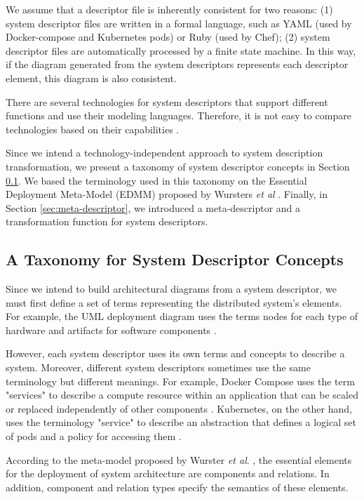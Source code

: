 \documentclass[sigconf]{acmart}
\begin{document}
We assume that a descriptor file is inherently consistent for two reasons: (1) system descriptor files are written in a formal language, such as YAML (used by Docker-compose and Kubernetes pods) or Ruby (used by Chef); (2) system descriptor files are automatically processed by a finite state machine. 
In this way, if the diagram generated from the system descriptors represents each descriptor element, this diagram is also consistent.

There are several technologies for system descriptors that support different functions and use their modeling languages. Therefore, it is not easy to compare technologies based on their capabilities \cite{wurster2019}.

Since we intend a technology-independent approach to system description transformation, we present a taxonomy of system descriptor concepts in Section \ref{sec:taxonomy}. We based the terminology used in this taxonomy on the Essential Deployment Meta-Model (EDMM) proposed by Wursters \textit{et al} \cite{wurster2019}. Finally, in Section \ref{sec:meta-descriptor}, we introduced a meta-descriptor and a transformation function for system descriptors.

\subsection{A Taxonomy for System Descriptor Concepts}
\label{sec:taxonomy}
Since we intend to build architectural diagrams from a system descriptor, we must first define a set of terms representing the distributed system's elements. For example, the UML deployment diagram uses the terms nodes for each type of hardware and artifacts for software components \cite{rumbaugh2004}.

However, each system descriptor uses its own terms and concepts to describe a system. Moreover, different system descriptors sometimes use the same terminology but different meanings. For example, Docker Compose uses the term "services" to describe a compute resource within an application that can be scaled or replaced independently of other components \cite{dockercompose2019}. Kubernetes, on the other hand, uses the terminology "service" to describe an abstraction that defines a logical set of pods and a policy for accessing them \cite{kubernetesservice2022}.

According to the meta-model proposed by Wurster \textit{et al}. \cite{wurster2019}, the essential elements for the deployment of system architecture are components and relations. In addition, component and relation types specify the semantics of these elements.
\end{document}
